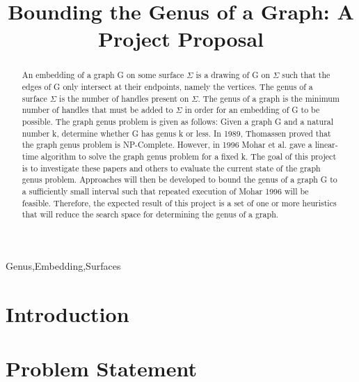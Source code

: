 \documentclass[12pt,conference]{IEEEtran}
\begin{document}
\raggedbottom

\title{Bounding the Genus of a Graph: A Project Proposal}

\author{
}

\maketitle

\begin{abstract}

An embedding of a graph G on some surface $\Sigma$ is a drawing of G on $\Sigma$ such that the edges of G only intersect at their endpoints, namely the vertices. The genus of a surface $\Sigma$ is the number of handles present on $\Sigma$. The genus of a graph is the minimum number of handles that must be added to $\Sigma$ in order for an embedding of G to be possible. The graph genus problem is given as follows: Given a graph G and a natural number k, determine whether G has genus k or less. In 1989, Thomassen proved that the graph genus problem is NP-Complete. However, in 1996 Mohar et al. gave a linear-time algorithm to solve the graph genus problem for a fixed k. The goal of this project is to investigate these papers and others to evaluate the current state of the graph genus problem. Approaches will then be developed to bound the genus of a graph G to a sufficiently small interval such that repeated execution of Mohar 1996 will be feasible. Therefore, the expected result of this project is a set of one or more heuristics that will reduce the search space for determining the genus of a graph.

\end{abstract}

\begin{IEEEkeywords}
Genus,Embedding,Surfaces
\end{IEEEkeywords}

\section{Introduction}

\section{Problem Statement}
\end{document}
